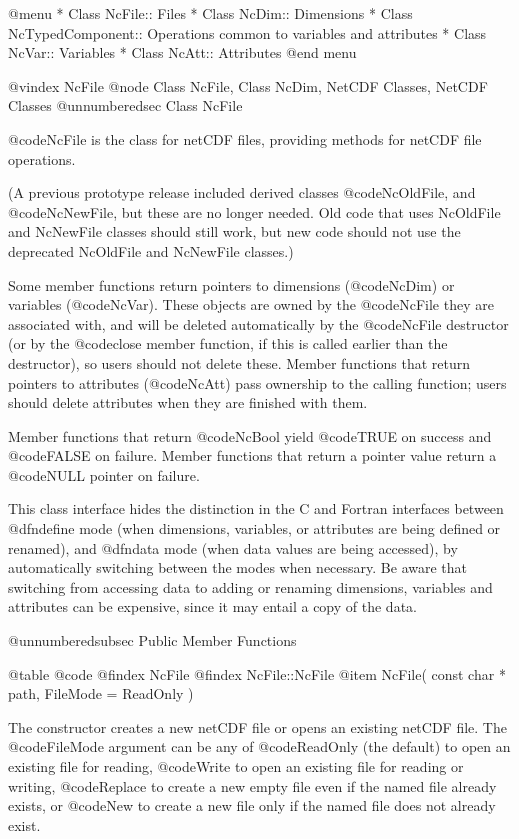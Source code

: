 @menu
* Class NcFile::                Files
* Class NcDim::                 Dimensions
* Class NcTypedComponent::      Operations common to variables and attributes
* Class NcVar::                 Variables
* Class NcAtt::                 Attributes
@end menu

@vindex NcFile
@node Class NcFile, Class NcDim, NetCDF Classes, NetCDF Classes
@unnumberedsec  Class NcFile

@code{NcFile} is the class for netCDF files,
providing methods for netCDF file operations.

(A previous prototype release included derived classes @code{NcOldFile},
and @code{NcNewFile}, but these are no longer needed.  Old code that
uses NcOldFile and NcNewFile classes should still work, but new code
should not use the deprecated NcOldFile and NcNewFile classes.)

Some member functions return pointers to dimensions (@code{NcDim}) or
variables (@code{NcVar}).  These objects are owned by the @code{NcFile}
they are associated with, and will be deleted automatically by the
@code{NcFile} destructor (or by the @code{close} member function, if
this is called earlier than the destructor), so users should not delete
these.  Member functions that return pointers to attributes
(@code{NcAtt}) pass ownership to the calling function; users
should delete attributes when they are finished with them.  

Member functions that return @code{NcBool} yield @code{TRUE} on success
and @code{FALSE} on failure.  Member functions that return a pointer
value return a @code{NULL} pointer on failure.

This class interface hides the distinction in the C and Fortran
interfaces between @dfn{define mode} (when dimensions, variables, or
attributes are being defined or renamed), and @dfn{data mode} (when data
values are being accessed), by automatically switching between the modes
when necessary.  Be aware that switching from accessing data to adding
or renaming dimensions, variables and attributes can be expensive, since
it may entail a copy of the data.

@unnumberedsubsec Public Member Functions

@table @code
@findex NcFile
@findex NcFile::NcFile
@item NcFile( const char * path, FileMode = ReadOnly )

The constructor creates a new netCDF file or opens an existing netCDF
file.  The @code{FileMode} argument can be any of @code{ReadOnly} (the
default) to open an existing file for reading, @code{Write} to open an
existing file for reading or writing, @code{Replace} to create a new
empty file even if the named file already exists, or
@code{New} to create a new file only if the named file does not already
exist.

